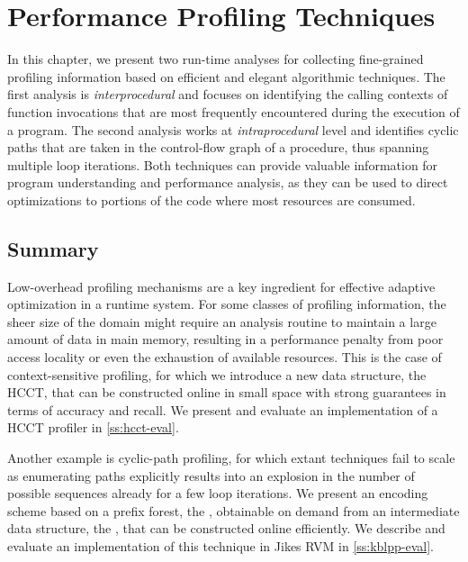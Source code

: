 \chapter{Performance Profiling Techniques}
\label{ch:profiling}

In this chapter, we present two run-time analyses for collecting fine-grained profiling information based on efficient and elegant algorithmic techniques. The first analysis is {\em interprocedural} and focuses on identifying the calling contexts of function invocations that are most frequently encountered during the execution of a program. The second analysis works at {\em intraprocedural} level and identifies cyclic paths that are taken in the control-flow graph of a procedure, thus spanning multiple loop iterations. Both techniques can provide valuable information for program understanding and performance analysis, as they can be used to direct optimizations to portions of the code where most resources are consumed.

\ifdefined\noauthorea

\newpage

\fi

\section{Summary}
Low-overhead profiling mechanisms are a key ingredient for effective adaptive optimization in a runtime system. For some classes of profiling information, the sheer size of the domain might require an analysis routine to maintain a large amount of data in main memory, resulting in a performance penalty from poor access locality or even the exhaustion of available resources. This is the case of context-sensitive profiling, for which we introduce a new data structure, the HCCT, that can be constructed online in small space with strong guarantees in terms of accuracy and recall. We present and evaluate an implementation of a HCCT profiler in \mysection\ref{ss:hcct-eval}.

Another example is cyclic-path profiling, for which extant techniques fail to scale as enumerating paths explicitly results into an explosion in the number of possible sequences already for a few loop iterations. We present an encoding scheme based on a prefix forest, the \kipf, obtainable on demand from an intermediate data structure, the \ksf, that can be constructed online efficiently. We describe and evaluate an implementation of this technique in Jikes RVM in \mysection\ref{ss:kblpp-eval}.